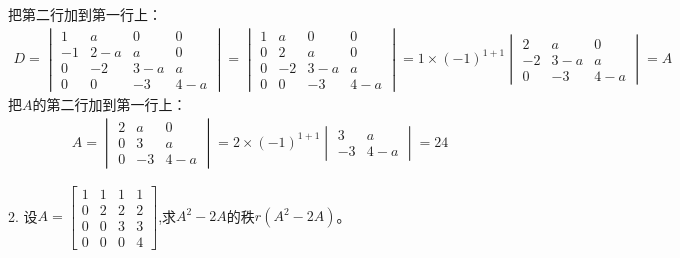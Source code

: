 \documentclass{article}
\begin{document}
\begin{jie}
把第二行加到第一行上：
\begin{align*}
D=
\begin{vmatrix}
  1 & a & 0 & 0\\
  -1 & 2-a & a & 0\\
  0 & -2 & 3-a & a\\
  0 & 0 & -3 & 4-a
\end{vmatrix}=\begin{vmatrix}
  1 & a & 0 & 0\\
  0 & 2 & a & 0\\
  0 & -2 & 3-a & a\\
  0 & 0 & -3 & 4-a
\end{vmatrix}=1\times(-1)^{1+1}
\begin{vmatrix}
  2 & a & 0\\
   -2 & 3-a & a\\
   0 & -3 & 4-a
\end{vmatrix}=A
\end{align*}
把$A$的第二行加到第一行上：
\begin{align*}
A=\begin{vmatrix}
  2 & a & 0\\
   0 & 3 & a\\
   0 & -3 & 4-a
\end{vmatrix}=2\times(-1)^{1+1}
\begin{vmatrix}
 3 & a\\
 -3 & 4-a
\end{vmatrix}=24
\end{align*}
\end{jie}

2. 设$
A=\begin{bmatrix}
    1 & 1 & 1 & 1\\
    0 & 2 & 2 & 2\\
    0 & 0 & 3 & 3\\
    0 & 0 & 0 & 4
  \end{bmatrix}
$,求$A^{2}-2A$的秩$r(A^{2}-2A)$。
\end{document}
